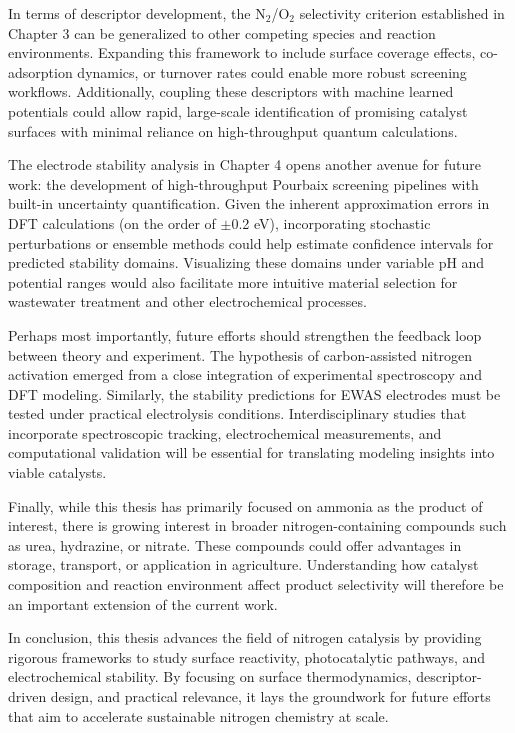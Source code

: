 
In terms of descriptor development, the N$_2$/O$_2$ selectivity criterion established in Chapter 3 can be generalized to other competing species and reaction environments. Expanding this framework to include surface coverage effects, co-adsorption dynamics, or turnover rates could enable more robust screening workflows. Additionally, coupling these descriptors with machine learned potentials could allow rapid, large-scale identification of promising catalyst surfaces with minimal reliance on high-throughput quantum calculations.

The electrode stability analysis in Chapter 4 opens another avenue for future work: the development of high-throughput Pourbaix screening pipelines with built-in uncertainty quantification. Given the inherent approximation errors in DFT calculations (on the order of $\pm$0.2 eV), incorporating stochastic perturbations or ensemble methods could help estimate confidence intervals for predicted stability domains. Visualizing these domains under variable pH and potential ranges would also facilitate more intuitive material selection for wastewater treatment and other electrochemical processes.

Perhaps most importantly, future efforts should strengthen the feedback loop between theory and experiment. The hypothesis of carbon-assisted nitrogen activation emerged from a close integration of experimental spectroscopy and DFT modeling. Similarly, the stability predictions for EWAS electrodes must be tested under practical electrolysis conditions. Interdisciplinary studies that incorporate spectroscopic tracking, electrochemical measurements, and computational validation will be essential for translating modeling insights into viable catalysts.

Finally, while this thesis has primarily focused on ammonia as the product of interest, there is growing interest in broader nitrogen-containing compounds such as urea, hydrazine, or nitrate. These compounds could offer advantages in storage, transport, or application in agriculture. Understanding how catalyst composition and reaction environment affect product selectivity will therefore be an important extension of the current work.

In conclusion, this thesis advances the field of nitrogen catalysis by providing rigorous frameworks to study surface reactivity, photocatalytic pathways, and electrochemical stability. By focusing on surface thermodynamics, descriptor-driven design, and practical relevance, it lays the groundwork for future efforts that aim to accelerate sustainable nitrogen chemistry at scale.









